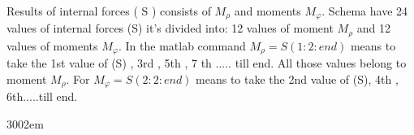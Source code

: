 Results of internal forces ( S ) consists of $M_{\rho}$ and moments $M_{\varphi}$. 
Schema have 24 values of internal forces (S) it's divided
into: 12 values of moment $M_{\rho}$ and 12 values of moments $M_{\varphi}$. In the matlab command
$M_{\rho}=S(1:2:end)$ means to take the 1st value of (S) , 3rd , 5th , 7 th ..... till end. All
those values belong to moment $M_{\rho}$. For $M_{\varphi}=S(2:2:end)$ means to take the 2nd value
of (S), 4th , 6th.....till end.\par
\begin{xtolerant}{300}{2em}
    {\noindent \footnotesize }
    {\noindent \footnotesize }    
  \end{xtolerant}